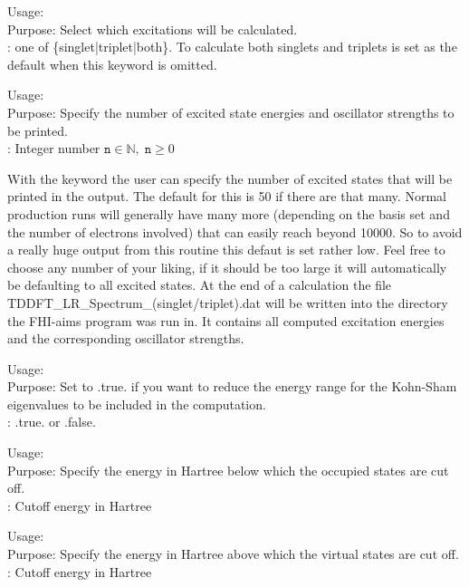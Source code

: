  {
\noindent
Usage:  \\
Purpose: Select which excitations will be calculated.\\
: one of \{singlet|triplet|both\}. To calculate both singlets and triplets is set as the default when this keyword is omitted.
}

 {
\noindent
Usage:  \\
Purpose: Specify the number of excited state energies and oscillator strengths to be printed.\\
: Integer number $\mathtt{n}\in\mathbb{N},\;\mathtt{n}\ge 0$
}

With the keyword  the user can specify the number of excited states that
will be printed in the output. The default for this is 50 if there are that many. Normal production runs will generally have many more (depending on the
basis set and the number of electrons involved) that can easily reach beyond 10000. So to avoid a really huge output from this routine this defaut is
set rather low. Feel free to choose any number of your liking, if it should be too large it will automatically be defaulting to all excited states. At the end
of a calculation the file TDDFT\_LR\_Spectrum\_(singlet/triplet).dat will be written into the directory the FHI-aims program was run in.
It contains all computed excitation energies and the corresponding oscillator strengths.

 {
\noindent
Usage:  \\
Purpose: Set to .true. if you want to reduce the energy range for the Kohn-Sham eigenvalues to be included in the computation.\\
: .true. or .false.\\
}

 {
\noindent
Usage:  \\
Purpose: Specify the energy in Hartree below which the occupied states are cut off.\\
: Cutoff energy in Hartree
}

 {
\noindent
Usage:  \\
Purpose: Specify the energy in Hartree above which the virtual states are cut off.\\
: Cutoff energy in Hartree
}
